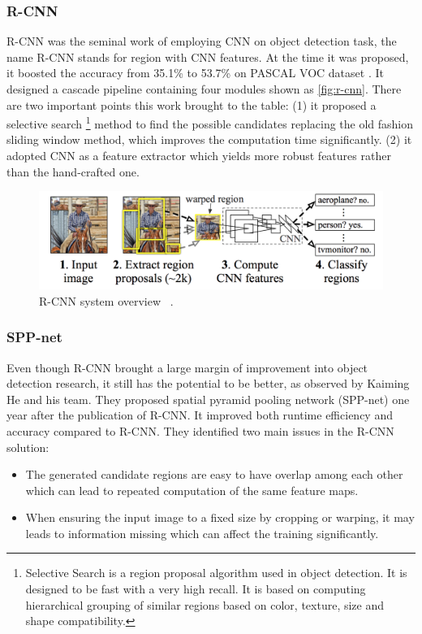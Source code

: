 \subsubsection{R-CNN}

R-CNN was the seminal work of employing CNN on object detection task, the name 
R-CNN stands for region with CNN features. At the
time it was proposed, it boosted the accuracy from 35.1\% to 53.7\% on PASCAL
VOC dataset \cite{r-cnn-paper-2013}.
It designed a cascade pipeline containing four modules shown as
\autoref{fig:r-cnn}.
There are two important points this work brought to the table:
(1) it proposed a selective search 
\footnote{Selective Search is a region 
proposal algorithm used in object detection. It is designed to be fast with a 
very high recall. It is based on computing hierarchical grouping of similar 
regions based on color, texture, size and shape compatibility.} 
method to find the possible candidates
replacing the old fashion sliding window method,
which improves the computation time significantly.
(2) it adopted CNN as a feature extractor which yields more robust
features rather than the hand-crafted one.

\begin{figure}
    \includegraphics[width=\linewidth]{figures/r_cnn.png}
    \caption{R-CNN system overview ~\protect\cite{r-cnn-paper-2013}.}
    \label{fig:r-cnn}
\end{figure}

\subsubsection{SPP-net}

Even though R-CNN brought a large margin of improvement into object detection
research, it still has the potential to be better, as observed by Kaiming He and
his team. They proposed spatial pyramid pooling network (SPP-net)
\cite{spp-net-paper-2014} one year after the publication of R-CNN. It improved
both runtime efficiency and accuracy compared to R-CNN.
They identified two main issues in the R-CNN solution:

\begin{itemize}
    \item The generated candidate regions are easy to have overlap among each 
    other which can lead to repeated computation of the same feature maps.

    \item When ensuring the input image to a fixed size by cropping or
    warping, it may leads to information
    missing which can affect the training significantly.
\end{itemize}

